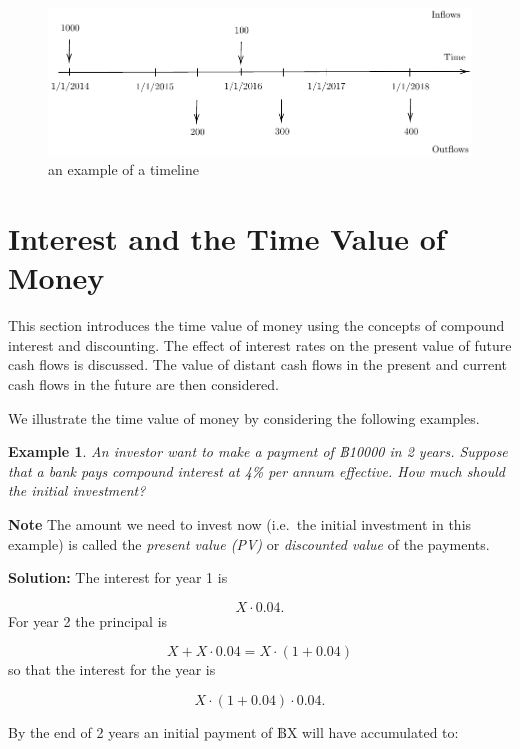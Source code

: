 \documentclass[
]{book}
\theoremstyle{definition}
\theoremstyle{definition}
\newtheorem{example}{Example}[chapter]
\theoremstyle{definition}
\theoremstyle{definition}
\theoremstyle{remark}
\begin{document}
\begin{figure}

{\centering \includegraphics{SCMA266Bookdownproj_files/figure-latex/tikz-ex1-1} 

}

\caption{an example of a timeline}\label{fig:tikz-ex1}
\end{figure}

\section{Interest and the Time Value of Money}\label{interest-and-the-time-value-of-money}

This section introduces the time value of money using the concepts of
compound interest and discounting. The effect of interest rates on the
present value of future cash flows is discussed. The value of distant
cash flows in the present and current cash flows in the future are then
considered.

We illustrate the time value of money by considering the following
examples.

\begin{example}
\protect\hypertarget{exm:egpv}{}\label{exm:egpv}\emph{An investor want to make a payment of ฿10000 in 2 years. Suppose that a
bank pays compound interest at 4\% per annum effective. How much should
the initial investment?}
\end{example}

\textbf{Note} The amount we need to invest now (i.e.~the initial investment
in this example) is called the \emph{present value (PV)} or \emph{discounted
value} of the payments.

\textbf{Solution:} The interest for year 1 is

\[ X \cdot 0.04.\] For year 2 the principal is

\[ X + X \cdot 0.04 = X \cdot (1 + 0.04)\] so that the interest for the
year is

\[ X \cdot (1 + 0.04) \cdot 0.04.\]

By the end of 2 years an initial payment of ฿X will have accumulated to:
\end{document}
